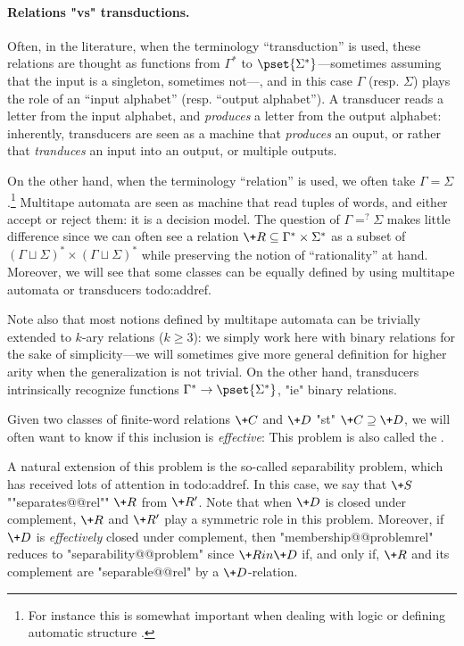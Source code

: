 \paragraph*{Relations "vs" transductions.}
Often, in the literature, when the terminology ``transduction'' is used,
these relations are thought as functions from $\Gamma^*$ to $\pset{\Sigma^*}$---sometimes
assuming that the input is a singleton, sometimes not---,
and in this case $\Gamma$ (resp. $\Sigma$) plays the role of an ``input alphabet''
(resp. ``output alphabet''). A transducer reads a letter from the input alphabet,
and \emph{produces} a letter from the output alphabet: inherently, transducers are seen
as a machine that \emph{produces} an ouput, or rather that \emph{tranduces} an input into an output, or multiple outputs.

On the other hand, when the terminology ``relation'' is used,
we often take $\Gamma = \Sigma$.\footnote{For instance this is somewhat important when
dealing with logic or defining automatic structure
.}
Multitape automata are seen as machine that read
tuples of words, and either accept or reject them: it is a decision model.
The question of $\Gamma =^? \Sigma$ makes little difference since we can often
see a relation $\+R \subseteq \Gamma^* \times \Sigma^*$ as a subset of
$(\Gamma\sqcup \Sigma)^* \times (\Gamma\sqcup \Sigma)^*$
while preserving the notion of ``rationality'' at hand.
Moreover, we will see that some classes can be equally defined
by using multitape automata or transducers todo:addref.

Note also that most notions defined by multitape automata
can be trivially extended to $k$-ary relations ($k \geq 3$):
we simply work here with binary relations for the sake of simplicity---we will sometimes give more general definition for higher arity when the generalization is not trivial.
On the other hand, transducers intrinsically recognize functions $\Gamma^* \to \pset{\Sigma^*}$,
"ie" binary relations.

Given two classes of finite-word relations $\+C$ and $\+D$ "st" $\+C \supseteq \+D$,
we will often want to know if this inclusion is \emph{effective}:
This problem is also called the .

A natural extension of this problem is the so-called separability problem,
which has received lots of attention in todo:addref.
In this case, we say that $\+S$ ""separates@@rel"" $\+R$ from $\+R'$.
Note that when $\+D$ is closed under complement, $\+R$ and $\+R'$ play a symmetric role in this problem. Moreover, if $\+D$ is \emph{effectively} closed under complement,
then "membership@@problemrel" reduces to "separability@@problem" 
since $\+R in \+D$ if, and only if, $\+R$ and its complement are "separable@@rel" by
a $\+D$-relation.


